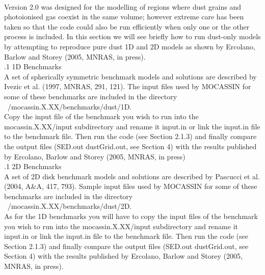 \documentclass[11pt]{article}
\begin{document}
\\
   Version 2.0 was designed for the modelling of regions where dust grains and photoionised 
   gas coexist in the same volume; however extreme care has been taken so that the code 
   could also be run efficiently when only one or the other process is included. 
   In this section we will see briefly how to run dust-only models by attempting to 
   reproduce pure dust 1D and 2D models as shown by Ercolano, Barlow and Storey 
   (2005, MNRAS, in press). \\

.1 1D Benchmarks\\
       A set of spherically symmetric benchmark models and solutions are described by 
       Ivezic et al. (1997, MNRAS, 291, 121). 
       The input files used by MOCASSIN for some of these benchmarks are included in 
       the directory ~/mocassin.X.XX/benchmarks/dust/1D. \\
       Copy the input file of the benchmark you wish to run  
       into the mocassin.X.XX/input subdirectory and rename it input.in or link the input.in 
       file to the benchmark file. Then run the code (see Section 2.1.3) and finally 
       compare the output files (SED.out dustGrid.out, see Section 4) with the results 
       published by Ercolano, Barlow and Storey (2005, MNRAS, in press)\\
     

.1 2D Benchmarks\\
       A set of 2D disk benchmark models and solutions are described by Pascucci et al. 
       (2004, A\&A, 417, 793).
       Sample input files used by MOCASSIN for some of these benchmarks are included in 
       the directory ~/mocassin.X.XX/benchmarks/dust/2D. \\
       As for the 1D benchmarks you will have to copy the input files of the 
       benchmark you wish to run  
       into the mocassin.X.XX/input subdirectory and rename it input.in or link the input.in 
       file to the benchmark file. Then run the code (see Section 2.1.3) and finally 
       compare the output files (SED.out dustGrid.out, see Section 4) with the results 
       published by Ercolano, Barlow and Storey (2005, MNRAS, in press).\\

\pagebreak 

 \\
\end{document}
